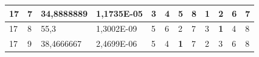 \documentclass[conference]{IEEEtran}
\begin{document}
\begin{table}[]
\begin{tabular}{|llll|llllllll|}
\multicolumn{1}{|l|}{17}                                                    & \multicolumn{1}{l|}{7}                                                        & \multicolumn{1}{l|}{34,8888889}                                                   & 1,1735E-05                     & \multicolumn{1}{l|}{3}                                                  & \multicolumn{1}{l|}{4}                                                  & \multicolumn{1}{l|}{5}                                                  & \multicolumn{1}{l|}{8}                                                  & \multicolumn{1}{l|}{\textbf{1}}                                         & \multicolumn{1}{l|}{2}                                                  & \multicolumn{1}{l|}{6}                                                  & 7                          \\ \hline
\multicolumn{1}{|l|}{17}                                                    & \multicolumn{1}{l|}{8}                                                        & \multicolumn{1}{l|}{55,3}                                                         & 1,3002E-09                     & \multicolumn{1}{l|}{5}                                                  & \multicolumn{1}{l|}{6}                                                  & \multicolumn{1}{l|}{2}                                                  & \multicolumn{1}{l|}{7}                                                  & \multicolumn{1}{l|}{3}                                                  & \multicolumn{1}{l|}{\textbf{1}}                                         & \multicolumn{1}{l|}{4}                                                  & 8                          \\ \hline
\multicolumn{1}{|l|}{17}                                                    & \multicolumn{1}{l|}{9}                                                        & \multicolumn{1}{l|}{38,4666667}                                                   & 2,4699E-06                     & \multicolumn{1}{l|}{5}                                                  & \multicolumn{1}{l|}{4}                                                  & \multicolumn{1}{l|}{\textbf{1}}                                         & \multicolumn{1}{l|}{7}                                                  & \multicolumn{1}{l|}{2}                                                  & \multicolumn{1}{l|}{3}                                                  & \multicolumn{1}{l|}{6}                                                  & 8                          \\ \hline

\end{tabular}
\end{table}
\end{document}
